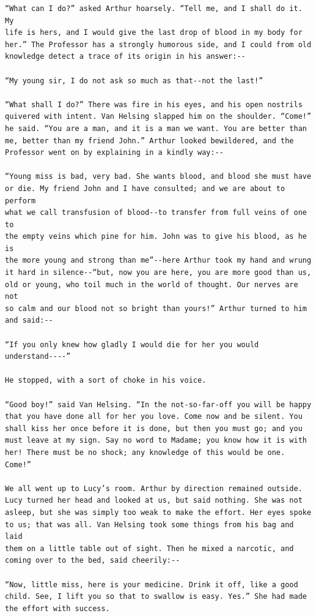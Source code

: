 \documentclass{article}
\begin{document}
\begin{verbatim}
“What can I do?” asked Arthur hoarsely. “Tell me, and I shall do it. My
life is hers, and I would give the last drop of blood in my body for
her.” The Professor has a strongly humorous side, and I could from old
knowledge detect a trace of its origin in his answer:--

“My young sir, I do not ask so much as that--not the last!”

“What shall I do?” There was fire in his eyes, and his open nostrils
quivered with intent. Van Helsing slapped him on the shoulder. “Come!”
he said. “You are a man, and it is a man we want. You are better than
me, better than my friend John.” Arthur looked bewildered, and the
Professor went on by explaining in a kindly way:--

“Young miss is bad, very bad. She wants blood, and blood she must have
or die. My friend John and I have consulted; and we are about to perform
what we call transfusion of blood--to transfer from full veins of one to
the empty veins which pine for him. John was to give his blood, as he is
the more young and strong than me”--here Arthur took my hand and wrung
it hard in silence--“but, now you are here, you are more good than us,
old or young, who toil much in the world of thought. Our nerves are not
so calm and our blood not so bright than yours!” Arthur turned to him
and said:--

“If you only knew how gladly I would die for her you would
understand----”

He stopped, with a sort of choke in his voice.

“Good boy!” said Van Helsing. “In the not-so-far-off you will be happy
that you have done all for her you love. Come now and be silent. You
shall kiss her once before it is done, but then you must go; and you
must leave at my sign. Say no word to Madame; you know how it is with
her! There must be no shock; any knowledge of this would be one. Come!”

We all went up to Lucy’s room. Arthur by direction remained outside.
Lucy turned her head and looked at us, but said nothing. She was not
asleep, but she was simply too weak to make the effort. Her eyes spoke
to us; that was all. Van Helsing took some things from his bag and laid
them on a little table out of sight. Then he mixed a narcotic, and
coming over to the bed, said cheerily:--

“Now, little miss, here is your medicine. Drink it off, like a good
child. See, I lift you so that to swallow is easy. Yes.” She had made
the effort with success.


\end{verbatim}
\end{document}

